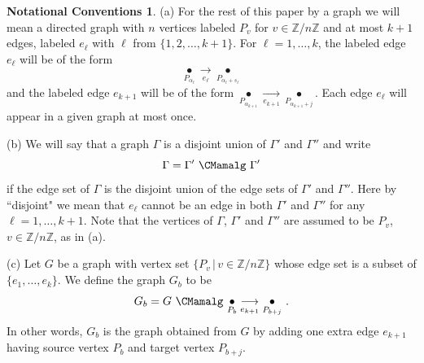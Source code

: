 \documentclass{amsproc}
\theoremstyle{definition}
\newtheorem{nc}[theorem]{Notational Conventions}
\theoremstyle{remark}
\numberwithin{equation}{section}
\newcommand{\Z}{{\mathbb Z}}
\begin{document}
\begin{nc} \label{nc.graph}
(a) For the rest of this paper by a graph we will mean a directed graph with $n$ vertices labeled $P_v$ for $v\in \Z/n\Z$ and
at most $k+1$ edges, labeled $e_{\ell}$ with $\ell$ from $\{ 1,2,\dots, k+1 \}$. 
For $\ell = 1, \ldots, k$, the labeled edge $e_{\ell}$ will be of the form
\[ \underset {P_{\alpha_{\ell}}} \bullet \underset {e_{\ell}} \longrightarrow \underset {P_{\alpha_{\ell} +s_{\ell}}} \bullet \]
and the labeled edge $e_{k+1}$ will be of the form
$ \underset {P_{\alpha_{k+1}}} \bullet \underset {e_{k+1}} \longrightarrow \underset {P_{\alpha_{k+1} + j}} \bullet$.
Each edge $e_{\ell}$ will appear in a given graph at most once.

\smallskip
(b) We will say that a graph $\Gamma$ is a disjoint union of $\Gamma'$ and $\Gamma''$ and write 
\[\Gamma = \Gamma' \ \CMamalg\ \Gamma '\]
if the edge set of $\Gamma$ is the disjoint union of the edge sets of $\Gamma'$ and $\Gamma''$. Here by ``disjoint" we mean that $e_{\ell}$ 
cannot be an edge in both $\Gamma'$ and $\Gamma''$ for any $\ell = 1, \ldots, k+1$. Note that the vertices of $\Gamma$, $\Gamma'$ and $\Gamma''$ are
assumed to be $P_v$, $v \in \mathbb Z/ n \mathbb Z$, as in (a).

\smallskip
(c) Let $G$ be a graph with vertex set $\{ P_v \, | \, v \in \Z/ n \Z \}$ whose edge set is a subset of $\{ e_1, \ldots, e_k \}$.
We define the graph $G_b$ to be
\[G_b=G\ \CMamalg\ \underset {P_b} \bullet \underset {e_{k+1}} \longrightarrow \underset {P_{b+j}} \bullet\ . \]
In other words, $G_b$ is the graph obtained from $G$ by adding one extra edge $e_{k+1}$ having 
source vertex $P_b$ and target vertex $P_{b+j}$.
\end{nc}
\end{document}
